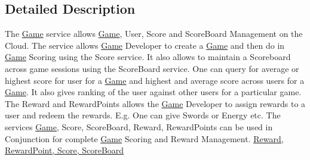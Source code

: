 \subsection{Detailed Description}
The \hyperlink{classcom_1_1shephertz_1_1app42_1_1paas_1_1sdk_1_1windows_1_1game_1_1_game}{Game} service allows \hyperlink{classcom_1_1shephertz_1_1app42_1_1paas_1_1sdk_1_1windows_1_1game_1_1_game}{Game}, User, Score and Score\+Board Management on the Cloud. The service allows \hyperlink{classcom_1_1shephertz_1_1app42_1_1paas_1_1sdk_1_1windows_1_1game_1_1_game}{Game} Developer to create a \hyperlink{classcom_1_1shephertz_1_1app42_1_1paas_1_1sdk_1_1windows_1_1game_1_1_game}{Game} and then do in \hyperlink{classcom_1_1shephertz_1_1app42_1_1paas_1_1sdk_1_1windows_1_1game_1_1_game}{Game} Scoring using the Score service. It also allows to maintain a Scoreboard across game sessions using the Score\+Board service. One can query for average or highest score for user for a \hyperlink{classcom_1_1shephertz_1_1app42_1_1paas_1_1sdk_1_1windows_1_1game_1_1_game}{Game} and highest and average score across users for a \hyperlink{classcom_1_1shephertz_1_1app42_1_1paas_1_1sdk_1_1windows_1_1game_1_1_game}{Game}. It also gives ranking of the user against other users for a particular game. The Reward and Reward\+Points allows the \hyperlink{classcom_1_1shephertz_1_1app42_1_1paas_1_1sdk_1_1windows_1_1game_1_1_game}{Game} Developer to assign rewards to a user and redeem the rewards. E.\+g. One can give Swords or Energy etc. The services \hyperlink{classcom_1_1shephertz_1_1app42_1_1paas_1_1sdk_1_1windows_1_1game_1_1_game}{Game}, Score, Score\+Board, Reward, Reward\+Points can be used in Conjunction for complete \hyperlink{classcom_1_1shephertz_1_1app42_1_1paas_1_1sdk_1_1windows_1_1game_1_1_game}{Game} Scoring and Reward Management. \hyperlink{classcom_1_1shephertz_1_1app42_1_1paas_1_1sdk_1_1windows_1_1game_1_1_game_service}{Reward, Reward\+Point, Score, Score\+Board} 



